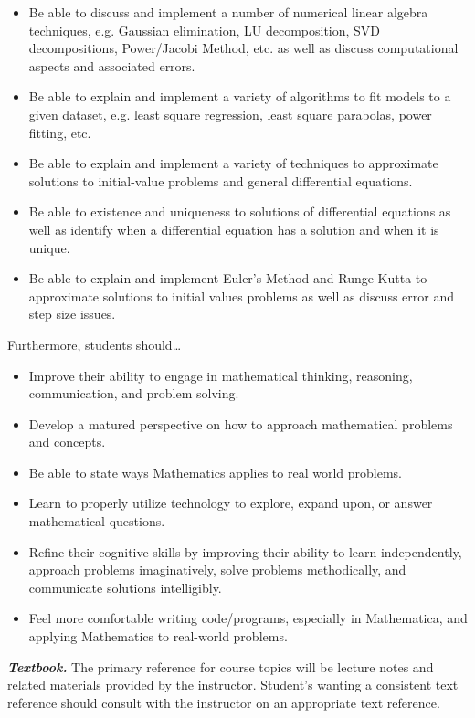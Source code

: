 \documentclass[11pt,letterpaper]{article}
\begin{document}
\begin{itemize}
	\item Be able to discuss and implement a number of numerical linear algebra techniques, e.g. Gaussian elimination, LU decomposition, SVD decompositions, Power/Jacobi Method, etc. as well as discuss computational aspects and associated errors.
	\item Be able to explain and implement a variety of algorithms to fit models to a given dataset, e.g. least square regression, least square parabolas, power fitting, etc. 
	\item Be able to explain and implement a variety of techniques to approximate solutions to initial-value problems and general differential equations.
	\item Be able to existence and uniqueness to solutions of differential equations as well as identify when a differential equation has a solution and when it is unique. 
	\item Be able to explain and implement Euler's Method and Runge-Kutta to approximate solutions to initial values problems as well as discuss error and step size issues. 
	\end{itemize} \pspace
Furthermore, students should\dots \pspace
	\begin{itemize} \itemsep=0.3ex
	\item  Improve their ability to engage in mathematical thinking, reasoning, communication, and problem solving.
	\item Develop a matured perspective on how to approach mathematical problems and concepts.
	\item Be able to state ways Mathematics applies to real world problems.
	\item Learn to properly utilize technology to explore, expand upon, or answer mathematical questions.
	\item Refine their cognitive skills by improving their ability to learn independently, approach problems imaginatively, solve problems methodically, and communicate solutions intelligibly.
	\item Feel more comfortable writing code/programs, especially in Mathematica, and applying Mathematics to real-world problems. 
	\end{itemize}
\sectionbreak



{\itshape\bfseries\color{stacred}Textbook.} The primary reference for course topics will be lecture notes and related materials provided by the instructor. Student's wanting a consistent text reference should consult with the instructor on an appropriate text reference. \pspace
\end{document}
